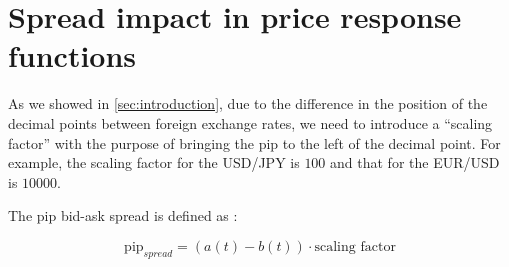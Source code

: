 \section{Spread impact in price response functions}\label{sec:spread_impact}


As we showed in \ref{sec:introduction}, due to the difference in the position of the decimal
points between foreign exchange rates, we need to introduce a ``scaling factor''
with the purpose of bringing the pip to the left of the decimal point.
For example, the scaling factor for the USD/JPY is $100$ and that for the
EUR/USD is $10000$.

The pip bid-ask spread is defined as \cite{micro_eff}:

\begin{equation}
    \text{pip}_{spread} = \left(a\left(t\right) - b\left(t\right)\right) \cdot \text{scaling factor}
\end{equation}